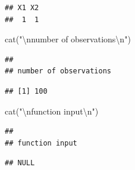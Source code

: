 \documentclass[
]{article}
\newenvironment{Shaded}{\begin{snugshade}}{\end{snugshade}}
\newcommand{\FunctionTok}[1]{\textcolor[rgb]{0.00,0.00,0.00}{#1}}
\newcommand{\NormalTok}[1]{#1}
\newcommand{\SpecialCharTok}[1]{\textcolor[rgb]{0.00,0.00,0.00}{#1}}
\newcommand{\StringTok}[1]{\textcolor[rgb]{0.31,0.60,0.02}{#1}}
\begin{document}
\begin{Shaded}
\end{Shaded}

\begin{verbatim}
## X1 X2 
##  1  1
\end{verbatim}

\begin{Shaded}
\begin{Highlighting}[]
\FunctionTok{cat}\NormalTok{(}\StringTok{"}\SpecialCharTok{\textbackslash{}n}\StringTok{number of observations}\SpecialCharTok{\textbackslash{}n}\StringTok{"}\NormalTok{)}
\end{Highlighting}
\end{Shaded}

\begin{verbatim}
## 
## number of observations
\end{verbatim}

\begin{Shaded}
\end{Shaded}

\begin{verbatim}
## [1] 100
\end{verbatim}

\begin{Shaded}
\begin{Highlighting}[]
\FunctionTok{cat}\NormalTok{(}\StringTok{"}\SpecialCharTok{\textbackslash{}n}\StringTok{function input}\SpecialCharTok{\textbackslash{}n}\StringTok{"}\NormalTok{)}
\end{Highlighting}
\end{Shaded}

\begin{verbatim}
## 
## function input
\end{verbatim}

\begin{Shaded}
\end{Shaded}

\begin{verbatim}
## NULL
\end{verbatim}
\end{document}
